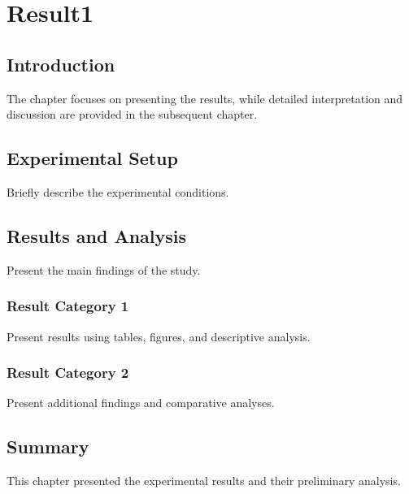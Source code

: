 \chapter{Result1}
\label{chapter:result1}

\section{Introduction}
The chapter focuses on presenting the results, while detailed interpretation and discussion are provided in the subsequent chapter.

\section{Experimental Setup}
Briefly describe the experimental conditions.

\section{Results and Analysis}
Present the main findings of the study. 

\subsection{Result Category 1}
Present results using tables, figures, and descriptive analysis.

\subsection{Result Category 2}
Present additional findings and comparative analyses.

\section{Summary}
This chapter presented the experimental results and their preliminary analysis. 